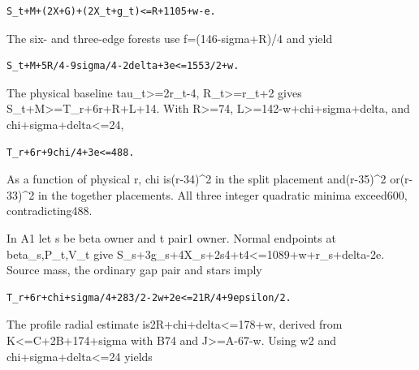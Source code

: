 \documentclass[10pt,a4paper]{article}
\theoremstyle{definition}
\begin{document}
\begin{lstlisting}
S_t+M+(2X+G)+(2X_t+g_t)<=R+1105+w-e.
\end{lstlisting}

The six- and three-edge forests use f=\allowbreak{}(146-sigma+\allowbreak{}R)/4 and yield

\begin{lstlisting}
S_t+M+5R/4-9sigma/4-2delta+3e<=1553/2+w.
\end{lstlisting}

The physical baseline tau\_\allowbreak{}t\textgreater=\allowbreak{}2r\_\allowbreak{}t-4,\allowbreak{}
R\_\allowbreak{}t\textgreater=\allowbreak{}r\_\allowbreak{}t+\allowbreak{}2 gives S\_\allowbreak{}t+\allowbreak{}M\textgreater=\allowbreak{}T\_\allowbreak{}r+\allowbreak{}6r+\allowbreak{}R+\allowbreak{}L+\allowbreak{}14. With
R\textgreater=\allowbreak{}74,\allowbreak{} L\textgreater=\allowbreak{}142-w+\allowbreak{}chi+\allowbreak{}sigma+\allowbreak{}delta,\allowbreak{} and
chi+\allowbreak{}sigma+\allowbreak{}delta\textless=\allowbreak{}24,\allowbreak{}

\begin{lstlisting}
T_r+6r+9chi/4+3e<=488.
\end{lstlisting}

As a function of physical r,\allowbreak{} chi is(r-34)\^{}2 in the split placement
and(r-35)\^{}2 or(r-33)\^{}2 in the together placements. All three
integer quadratic minima exceed600,\allowbreak{} contradicting488.

In A1 let s be beta owner and t pair1 owner. Normal endpoints at
beta\_\allowbreak{}s,\allowbreak{}P\_\allowbreak{}t,\allowbreak{}V\_\allowbreak{}t give
S\_\allowbreak{}s+\allowbreak{}3g\_\allowbreak{}s+\allowbreak{}4X\_\allowbreak{}s+\allowbreak{}2s4+\allowbreak{}t4\textless=\allowbreak{}1089+\allowbreak{}w+\allowbreak{}r\_\allowbreak{}s+\allowbreak{}delta-2e. Source mass,\allowbreak{} the
ordinary gap pair and stars imply

\begin{lstlisting}
T_r+6r+chi+sigma/4+283/2-2w+2e<=21R/4+9epsilon/2.
\end{lstlisting}

The profile radial estimate is2R+\allowbreak{}chi+\allowbreak{}delta\textless=\allowbreak{}178+\allowbreak{}w,\allowbreak{} derived from
K\textless=\allowbreak{}C+\allowbreak{}2B+\allowbreak{}174+\allowbreak{}sigma with B74 and J\textgreater=\allowbreak{}A-67-w. Using w2
and chi+\allowbreak{}sigma+\allowbreak{}delta\textless=\allowbreak{}24 yields
\end{document}
